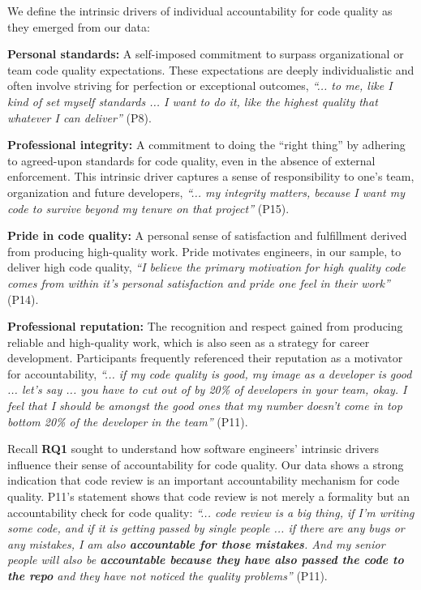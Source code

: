 We define the intrinsic drivers of individual accountability for code quality as they emerged from our data:

\textbf{Personal standards:} A self-imposed commitment to surpass organizational or team code quality expectations. These expectations are deeply individualistic and often involve striving for perfection or exceptional outcomes, \emph{``... to me, like I kind of set myself standards ... I want to do it, like the highest quality that whatever I can deliver''} (P8).

\textbf{Professional integrity:} A commitment to doing the ``right thing'' by adhering to agreed-upon standards for code quality, even in the absence of external enforcement. This intrinsic driver captures a sense of responsibility to one's team, organization and future developers, \emph{``... my integrity matters, because I want my code to survive beyond my tenure on that project''} (P15).

\textbf{Pride in code quality:} A personal sense of satisfaction and fulfillment derived from producing high-quality work. Pride motivates engineers, in our sample, to deliver high code quality, \emph{``I believe the primary motivation for high quality code comes from within it's personal satisfaction and pride one feel in their work''} (P14).

\textbf{Professional reputation:} The recognition and respect gained from producing reliable and high-quality work, which is also seen as a strategy for career development. Participants frequently referenced their reputation as a motivator for accountability, \emph{``...  if my code quality is good, my image as a developer is good ... let's say ... you have to cut out of by 20\% of developers in your team, okay. I feel that I should be amongst the good ones that my number doesn't come in top bottom 20\% of the developer in the team''} (P11).

Recall \textbf{RQ1} sought to understand how software engineers' intrinsic drivers influence their sense of accountability for code quality. Our data shows a strong indication that code review is an important accountability mechanism for code quality. P11's statement shows that code review is not merely a formality but an accountability check for code quality: \emph{``... code review is a big thing, if I'm writing some code, and if it is getting passed by single people ... if there are any bugs or any mistakes, I am also \textbf{accountable for those mistakes}. And my senior people will also be \textbf{accountable because they have also passed the code to the repo} and they have not noticed the quality problems''} (P11). 

